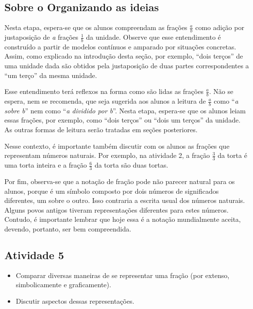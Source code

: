\subsection{Sobre o Organizando as ideias}



  Nesta etapa, espera-se que os alunos compreendam as frações   $\frac{a}{b}$ como adição por justaposição de   {\it a}   frações   $\frac{1}{b}$ da unidade. Observe que esse entendimento é construído a partir de modelos contínuos e amparado por situações concretas. Assim, como explicado na introdução desta seção, por exemplo,   ``dois terços'' de uma unidade dada são obtidos pela justaposição de duas partes correspondentes a   ``um terço'' da mesma unidade.

  Esse entendimento terá reflexos na forma como são lidas as frações   $\frac{a}{b}$. Não se espera, nem se recomenda, que seja sugerida aos alunos a leitura de   $\frac{a}{b}$ como   ``{\it a sobre b}'' nem como   ``{\it a dividido por b}''. Nesta etapa, espera-se que os alunos leiam essas frações, por exemplo, como   ``dois terços'' ou   ``dois um terços'' da unidade. As outras formas de leitura serão tratadas em seções posteriores.

  Nesse contexto, é importante também discutir com os alunos as frações que representam números naturais. Por exemplo, na atividade 2, a fração   $\frac{3}{3}$ da torta é uma torta inteira e a fração   $\frac{6}{3}$ da torta são duas tortas.

  Por fim, observa-se que a notação de fração pode não parecer natural para os alunos, porque é um símbolo composto por dois números de significados diferentes, um sobre o outro. Isso contraria a escrita usual dos números naturais. Alguns povos antigos tiveram representações diferentes para estes números.  Contudo, é importante lembrar que hoje essa é a notação mundialmente aceita, devendo, portanto, ser bem compreendida.

\Bg


\subsection{Atividade 5}

   \vspace{.1cm}

  \begin{itemize} %
    \item       Comparar diversas maneiras de se representar uma fração (por extenso, simbolicamente e graficamente).
    \item       Discutir aspectos dessas representações.
\end{itemize} %


